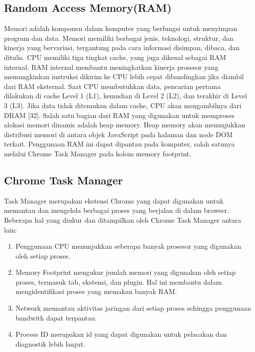 \subsection{Random Access Memory(RAM)}
Memori adalah komponen dalam komputer yang berfungsi untuk menyimpan program dan data. Memori memiliki berbagai jenis, teknologi, struktur, dan kinerja yang bervariasi, tergantung pada cara informasi disimpan, dibaca, dan ditulis. CPU memiliki tiga tingkat cache, yang juga dikenal sebagai RAM internal. RAM internal membantu meningkatkan kinerja prosesor yang memungkinkan instruksi dikirim ke CPU lebih cepat dibandingkan jika diambil dari RAM eksternal. Saat CPU membutuhkan data, pencarian pertama dilakukan di cache Level 1 (L1), kemudian di Level 2 (L2), dan terakhir di Level 3 (L3). Jika data tidak ditemukan dalam cache, CPU akan mengambilnya dari DRAM [32]. Salah satu bagian dari RAM yang digunakan untuk memproses alokasi memori dinamis adalah heap memory. Heap memory akan menunjukkan distribusi memori di antara objek JavaScript pada halaman dan node DOM terkait. Penggunaan RAM ini dapat dipantau pada komputer, salah satunya melalui Chrome Task Manager pada kolom memory footprint. 

\subsection{Chrome Task Manager}
Task Manager merupakan ekstensi Chrome yang dapat digunakan untuk memantau dan mengelola berbagai proses yang berjalan di dalam browser.  Beberapa hal yang diukur dan ditampilkan oleh Chrome Task Manager antara lain:
\begin{enumerate}
	\item Penggunaan CPU menunjukkan seberapa banyak prosesor yang digunakan oleh setiap proses. 
	\item Memory Footprint mengukur jumlah memori yang digunakan oleh setiap proses, termasuk tab, ekstensi, dan plugin. Hal ini membantu dalam mengidentifikasi proses yang memakan banyak RAM.
	\item Network memantau aktivitas jaringan dari setiap proses sehingga penggunaan bandwith dapat terpantau. 
	\item Process ID merupakan id yang dapat digunakan untuk pelacakan dan diagnostik lebih lanjut.
\end{enumerate}